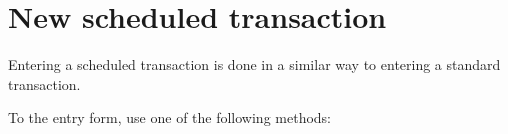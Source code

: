 \section{New scheduled transaction\label{plannedtransactions-new}}

Entering a scheduled transaction is done in a similar way to entering a standard transaction.

To  the entry form, use one of the following methods:
